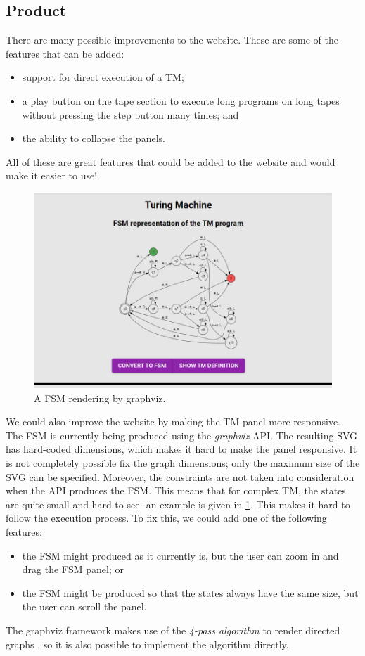  \subsection{Product}
There are many possible improvements to the website. These are some of the features that can be added:
\begin{itemize}
    \item support for direct execution of a TM;
    \item a play button on the tape section to execute long programs on long tapes without pressing the step button many times; and
    \item the ability to collapse the panels.
\end{itemize}
All of these are great features that could be added to the website and would make it easier to use!

\begin{figure}[htb]
    \centering
    \includegraphics[scale=0.3]{images/Bad FSM visualisation.png}
    \caption{A FSM rendering by graphviz.}
    \label{fig:bad_graphviz_fsm}
\end{figure}

We could also improve the website by making the TM panel more responsive. The FSM is currently being produced using the \textit{graphviz} API. The resulting SVG has hard-coded dimensions, which makes it hard to make the panel responsive. It is not completely possible fix the graph dimensions; only the maximum size of the SVG can be specified. Moreover, the constraints are not taken into consideration when the API produces the FSM. This means that for complex TM, the states are quite small and hard to see- an example is given in \ref{fig:bad_graphviz_fsm}. This makes it hard to follow the execution process. To fix this, we could add one of the following features:
\begin{itemize}
    \item the FSM might produced as it currently is, but the user can zoom in and drag the FSM panel; or
    \item the FSM might be produced so that the states always have the same size, but the user can scroll the panel. 
\end{itemize}
The graphviz framework makes use of the \emph{4-pass algorithm} to render directed graphs \citep{gansner1993technique, gansner2006drawing}, so it is also possible to implement the algorithm directly.

